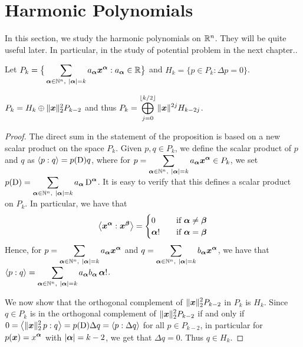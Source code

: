 \section{Harmonic Polynomials} \label{SectHramPoly}

In this section, we study the harmonic polynomials on
$\mathbb{R}^n$.  They will be quite useful later.  In particular, in the
study of potential problem in the next chapter..

Let $\displaystyle P_k
= \big\{ \sum_{{\bm{\alpha}} \in \mathbb{N}^n,\ |{\bm{\alpha}}| = k} a_{{\bm{\alpha}}}
{\bm{x}}^{{\bm{\alpha}}} : a_{{\bm{\alpha}}} \in \mathbb{R}  \big\}$
and $H_k = \{ p \in P_k : \Delta p = 0 \}$.

\begin{prop} \label{PkHkrPkm2}
$P_k = H_k \oplus \|{\bm{x}}\|_2^2 P_{k-2}$ and thus
$\displaystyle P_k = \bigoplus_{j=0}^{\lfloor{k/2}\rfloor} \|{\bm{x}}\|^{2j} H_{k-2j}$.
\end{prop}

\begin{proof}
The direct sum in the statement of the proposition is based on a new
scalar product on the space $P_k$.  Given $p,q \in P_k$, we define the
scalar product of $p$ and $q$ as $\left\langle{p} : {q}\right\rangle = p(\operatorname{D}) q$, where
for $\displaystyle p = \sum_{{\bm{\alpha}} \in \mathbb{N}^n,\ |{\bm{\alpha}}| = k}
a_{{\bm{\alpha}}} {\bm{x}}^{{\bm{\alpha}}} \in P_k$, we set
$\displaystyle p(\operatorname{D}) = \sum_{{\bm{\alpha}} \in \mathbb{N}^n,\ |{\bm{\alpha}}| = k}
a_{{\bm{\alpha}}} \operatorname{D}^{{\bm{\alpha}}}$.
It is easy to verify that this defines a scalar product on $P_k$.
In particular, we have that
\[
\left\langle{{\bm{x}}^{{\bm{\alpha}}}} : {{\bm{x}}^{{\bm{\beta}}}}\right\rangle =
\begin{cases}
0 & \quad \text{if} \ {\bm{\alpha}} \neq {\bm{\beta}} \\
{\bm{\alpha}}! & \quad \text{if} \ {\bm{\alpha}} = {\bm{\beta}} \\
\end{cases}
\]
Hence, for
$\displaystyle p = \sum_{{\bm{\alpha}} \in \mathbb{N}^n,\ |{\bm{\alpha}}| = k}
a_{{\bm{\alpha}}} {\bm{x}}^{{\bm{\alpha}}}$ and
$\displaystyle q = \sum_{\VEC{\alpha} \in \NN^n,\ |\VEC{\alpha}| = k}
b_{\VEC{\alpha}} \VEC{x}^{\VEC{\alpha}}$, we have that
$\displaystyle \left\langle{p} : {q}\right\rangle = \sum_{{\bm{\alpha}} \in \mathbb{N}^n,\ |{\bm{\alpha}}| = k}
a_{{\bm{\alpha}}} b_{{\bm{\alpha}}} \, {\bm{\alpha}}!$.

We now show that the orthogonal complement of
$\displaystyle \|{\bm{x}}\|_2^2 P_{k-2}$
in $P_k$ is $H_k$.  Since $q \in P_k$ is in the orthogonal complement 
of $\displaystyle \|{\bm{x}}\|_2^2 P_{k-2}$ if and only if
$\displaystyle 0 = \left\langle{\|{\bm{x}}\|_2^2\, p} : {q}\right\rangle =  p(\operatorname{D}) \Delta q
= \left\langle{p} : {\Delta q}\right\rangle$ for all $p \in P_{k-2}$, in particular for
$\displaystyle p({\bm{x}}) = x^{{\bm{\alpha}}}$ with $|{\bm{\alpha}}| = k-2$,
we get that $\Delta q = 0$.  Thus $q \in H_k$.
\end{proof}


